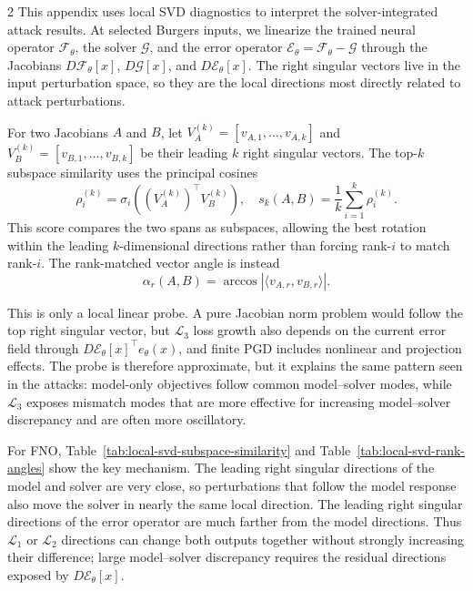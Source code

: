 \documentclass[letterpaper]{article} %
\newcommand{\tabref}[1]{Table~\ref{#1}}
\begin{document}
\begin{multicols}{2}
This appendix uses local SVD diagnostics to interpret the solver-integrated
attack results. At selected Burgers inputs, we linearize the trained neural
operator $\mathcal{F}_\theta$, the solver $\mathcal{G}$, and the error operator
$\mathcal{E}_\theta=\mathcal{F}_\theta-\mathcal{G}$ through the Jacobians
$D\mathcal{F}_\theta[x]$, $D\mathcal{G}[x]$, and
$D\mathcal{E}_\theta[x]$. The right singular vectors live in the input
perturbation space, so they are the local directions most directly related to
attack perturbations.

For two Jacobians $A$ and $B$, let
$V_A^{(k)}=[v_{A,1},\ldots,v_{A,k}]$ and
$V_B^{(k)}=[v_{B,1},\ldots,v_{B,k}]$ be their leading $k$ right singular
vectors. The top-$k$ subspace similarity uses the principal cosines
\begin{equation*}
  \rho_i^{(k)}
  =
  \sigma_i\!\left((V_A^{(k)})^\top V_B^{(k)}\right),
  \quad
  s_k(A,B)=\frac{1}{k}\sum_{i=1}^k \rho_i^{(k)} .
\end{equation*}
This score compares the two spans as subspaces, allowing the best rotation
within the leading $k$-dimensional directions rather than forcing rank-$i$ to
match rank-$i$. The rank-matched vector angle is instead
\begin{equation*}
  \alpha_r(A,B)
  =
  \arccos |\langle v_{A,r},v_{B,r}\rangle| .
\end{equation*}

This is only a local linear probe. A pure Jacobian norm problem would
follow the top right singular vector, but $\mathcal{L}_3$ loss growth also
depends on the current error field through
$D\mathcal{E}_\theta[x]^\top e_\theta(x)$, and finite PGD includes nonlinear
and projection effects. The probe is therefore approximate, but it explains
the same pattern seen in the attacks: model-only objectives follow common
model--solver modes, while $\mathcal{L}_3$ exposes mismatch modes that are more
effective for increasing model--solver discrepancy and are often more
oscillatory.

For FNO, \tabref{tab:local-svd-subspace-similarity} and
\tabref{tab:local-svd-rank-angles} show the key mechanism. The leading right
singular directions of the model and solver are very close, so perturbations
that follow the model response also move the solver in nearly the same local
direction. The leading right singular directions of the error operator are
much farther from the model directions. Thus $\mathcal{L}_1$ or $\mathcal{L}_2$ directions
can change both outputs together without strongly increasing their difference;
large model--solver discrepancy requires the residual directions exposed by
$D\mathcal{E}_\theta[x]$.
\end{multicols}
\end{document}
